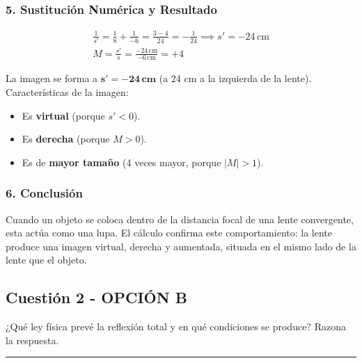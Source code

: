 \subsubsection*{5. Sustitución Numérica y Resultado}
\begin{gather}
    \frac{1}{s'} = \frac{1}{8} + \frac{1}{-6} = \frac{3-4}{24} = -\frac{1}{24} \implies s' = -24 \, \text{cm} \\
    M = \frac{s'}{s} = \frac{-24\,\text{cm}}{-6\,\text{cm}} = +4
\end{gather}
\begin{cajaresultado}
La imagen se forma a $\boldsymbol{s' = -24 \, \textbf{cm}}$ (a 24 cm a la izquierda de la lente).
Características de la imagen:
\begin{itemize}
    \item Es \textbf{virtual} (porque $s'<0$).
    \item Es \textbf{derecha} (porque $M>0$).
    \item Es de \textbf{mayor tamaño} (4 veces mayor, porque $|M|>1$).
\end{itemize}
\end{cajaresultado}

\subsubsection*{6. Conclusión}
\begin{cajaconclusion}
Cuando un objeto se coloca dentro de la distancia focal de una lente convergente, esta actúa como una lupa. El cálculo confirma este comportamiento: la lente produce una imagen virtual, derecha y aumentada, situada en el mismo lado de la lente que el objeto.
\end{cajaconclusion}

\newpage

\subsection{Cuestión 2 - OPCIÓN B}
\label{subsec:3B_2008_jun_ord}
\begin{cajaenunciado}
¿Qué ley física prevé la reflexión total y en qué condiciones se produce? Razona la respuesta.
\end{cajaenunciado}
\hrule

